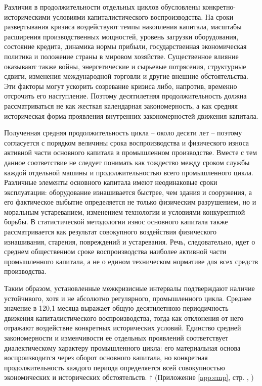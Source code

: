 Различия в продолжительности отдельных циклов обусловлены конкретно-историческими условиями капиталистического воспроизводства. На сроки развертывания кризиса воздействуют темпы накопления капитала, масштабы расширения производственных мощностей, уровень загрузки оборудования, состояние кредита, динамика нормы прибыли, государственная экономическая политика и положение страны в мировом хозяйстве. Существенное влияние оказывают также войны, энергетические и сырьевые потрясения, структурные сдвиги, изменения международной торговли и другие внешние обстоятельства. Эти факторы могут ускорить созревание кризиса либо, напротив, временно отсрочить его наступление. Поэтому десятилетняя продолжительность должна рассматриваться не как жесткая календарная закономерность, а как средняя историческая форма проявления внутренних закономерностей движения капитала.

Полученная средняя продолжительность цикла – около десяти лет – поэтому согласуется с порядком величины срока воспроизводства и физического износа активной части основного капитала в промышленном производстве. Вместе с тем данное соответствие не следует понимать как тождество между сроком службы каждой отдельной машины и продолжительностью всего промышленного цикла. Различные элементы основного капитала имеют неодинаковые сроки эксплуатации: оборудование изнашивается быстрее, чем здания и сооружения, а его фактическое выбытие определяется не только физическим разрушением, но и моральным устареванием, изменением технологии и условиями конкурентной борьбы. В статистической методологии износ основного капитала также рассматривается как результат совокупного воздействия физического изнашивания, старения, повреждений и устаревания.  Речь, следовательно, идет о среднем общественном сроке воспроизводства наиболее активной части промышленного капитала, а не о едином техническом нормативе для всех средств производства.

Таким образом, установленные межкризисные интервалы подтверждают наличие устойчивого, хотя и не абсолютно регулярного, промышленного цикла. Среднее значение в 120,1 месяца выражает общую десятилетнюю периодичность движения капиталистического воспроизводства, тогда как отклонения от него отражают воздействие конкретных исторических условий. Единство средней закономерности и изменчивости ее отдельных проявлений соответствует диалектическому характеру промышленного цикла: его материальная основа воспроизводится через оборот основного капитала, но конкретная продолжительность каждого периода определяется всей совокупностью экономических и исторических обстоятельств. $\dagger$ (Приложение \ref{app:emp}, стр. \pageref{fig:indpro}, \pageref{fig:phases-duration})

